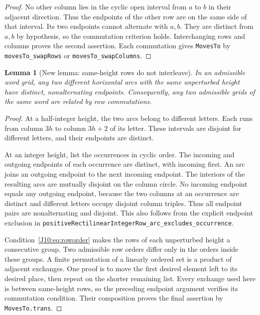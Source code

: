 \documentclass[11pt,oneside]{report}
\newtheorem{lemma}[theorem]{Lemma}
\theoremstyle{definition}
\numberwithin{equation}{section}
\newcommand{\decl}[1]{\textnormal{\nolinkurl{#1}}}
\begin{document}
\begin{proof}
No other column lies in the cyclic open interval from $a$ to $b$ in
their adjacent direction. Thus the endpoints of the other row are on
the same side of that interval. Its two endpoints cannot alternate
with $a,b$. They are distinct from $a,b$ by hypothesis, so the
commutation criterion holds. Interchanging rows and columns proves
the second assertion. Each commutation gives \decl{MovesTo} by
\decl{movesTo_swapRows} or \decl{movesTo_swapColumns}.
\end{proof}

\begin{lemma}[New lemma: same-height rows do not interleave]
\label{J10:lem:bands}
In an admissible word grid, any two different horizontal arcs with
the same unperturbed height have distinct, nonalternating endpoints.
Consequently, any two admissible grids of the same word are related
by row commutations.
\end{lemma}

\begin{proof}
At a half-integer height, the two arcs belong to different letters.
Each runs from column $3h$ to column $3h+2$ of its letter.
These intervals are disjoint for different letters, and their
endpoints are distinct.

At an integer height, list the occurrences in cyclic order.
The incoming and outgoing endpoints of each occurrence are distinct,
with incoming first. An arc joins an outgoing endpoint to the next
incoming endpoint. The interiors of the resulting arcs are mutually
disjoint on the column circle. No incoming endpoint equals any
outgoing endpoint, because the two columns at an occurrence are
distinct and different letters occupy disjoint column triples.
Thus all endpoint pairs are nonalternating and disjoint. This also
follows from the explicit endpoint exclusion in
\decl{positiveRectilinearIntegerRow_arc_excludes_occurrence}.

Condition~\eqref{J10:eq:roworder} makes the rows of each unperturbed height
a consecutive group. Two admissible row orders differ only in the
orders inside these groups. A finite permutation of a linearly ordered
set is a product of adjacent exchanges. One proof is to move the first
desired element left to its desired place, then repeat on the shorter
remaining list. Every exchange used here is between same-height
rows, so the preceding endpoint argument verifies its commutation
condition. Their composition proves the final assertion by
\decl{MovesTo.trans}.
\end{proof}
\end{document}
